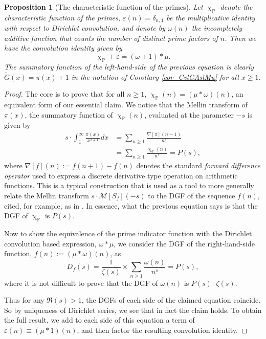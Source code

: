 \documentclass[11pt,reqno,a4letter]{article}
\numberwithin{figure}{section}
\numberwithin{table}{section}
\renewcommand{\chi}{\upchi}
\theoremstyle{plain}
\newtheorem{prop}[theorem]{Proposition}
\numberwithin{theorem}{section}
\theoremstyle{definition}
\begin{document}
\begin{prop}[The characteristic function of the primes] 
\label{prop_AntiqueDivisorSumIdent} 
Let $\chi_{\mathbb{P}}$ denote the characteristic function of the primes, 
$\varepsilon(n) = \delta_{n,1}$ be the multiplicative identity with respect to Dirichlet convolution, 
and denote by $\omega(n)$ the incompletely additive function that counts the number of 
distinct prime factors of $n$. 
Then we have the convolution identity given by 
$$\chi_{\mathbb{P}} + \varepsilon = (\omega + 1) \ast \mu.$$ 
The summatory function of the left-hand-side of the previous equation is 
clearly $\widetilde{G}(x) = \pi(x)+1$ in the notation of 
Corollary \ref{cor_CvlGAstMu} for all $x \geq 1$. 
\end{prop}
\begin{proof} 
The core is to prove that for all $n \geq 1$, 
$\chi_{\mathbb{P}}(n) = (\mu \ast \omega)(n)$, an equivalent form of our essential claim. 
We notice that the Mellin transform of $\pi(x)$, the summatory function of 
$\chi_{\mathbb{P}}(n)$, evaluated at the parameter $-s$ is given by 
\begin{align*} 
s \cdot \int_1^{\infty} \frac{\pi(x)}{x^{s+1}} dx & = \sum_{n \geq 1} \frac{\nabla[\pi](n-1)}{n^s} \\ 
     & = \sum_{n \geq 1} \frac{\chi_{\mathbb{P}}(n)}{n^s} = P(s), 
\end{align*} 
where $\nabla[f](n) := f(n+1) - f(n)$ denotes the standard 
\emph{forward difference operator} used to express a discrete derivative type operation on 
arithmetic functions. 
This is a typical construction that is used as a tool to more generally relate the Mellin transform 
$s \cdot \mathcal{M}[S_f](-s)$ to the 
DGF of the sequence $f(n)$, cited, for example, as in \cite[\S 11]{APOSTOLANUMT}. 
In essence, what the previous equation says is that the DGF of $\chi_{\mathbb{P}}$ is $P(s)$. 

Now to show the equivalence of the prime indicator function with the Dirichlet convolution based 
expression, $\omega \ast \mu$, we consider the 
DGF of the right-hand-side function, $f(n) := (\mu \ast \omega)(n)$, as 
\[
D_f(s) = \frac{1}{\zeta(s)} \times \sum_{n \geq 1} \frac{\omega(n)}{n^s} = P(s),  
\]
where it is not difficult to prove that the DGF of $\omega(n)$ is $P(s) \cdot \zeta(s)$. 

Thus for any $\Re(s) > 1$, the DGFs of each side of the 
claimed equation coincide. So by uniqueness of Dirichlet series, we see that in fact the claim 
holds. To obtain the full result, we add to each side of this equation a term of 
$\varepsilon(n) \equiv (\mu \ast 1)(n)$, and then factor the resulting convolution identity. 
\end{proof} 
\end{document}
